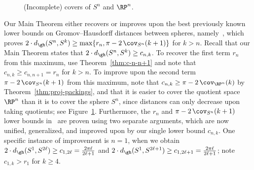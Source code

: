 \documentclass[11pt, reqno, english]{amsart}
\begin{document}
\begin{figure}[htb]
\caption{(Incomplete) covers of $S^n$ and $\RP^n$.}
\label{fig:cover}
\end{figure}

\begin{remark}
\label{rem:improvement}
Our Main Theorem either recovers or improves upon the best previously known lower bounds on Gromov--Hausdorff distances between spheres, namely~\cite{lim2021gromov}, which proves $2\cdot d_{\gh}(S^n, S^k) \ge \max\{r_n,\pi - 2\,\cov_{S^n}(k+1)\}$ for $k>n$.
Recall that our Main Theorem states that $2\cdot d_{\gh}(S^n, S^k) \geq c_{n,k}$.
To recover the first term $r_n$ from this maximum, use Theorem~\ref{thm:c-n-n+1} and note that $c_{n,k}\ge c_{n,n+1}=r_n$ for $k>n$.
To improve upon the second term $\pi - 2\,\cov_{S^n}(k+1)$ from this maximum, note that $c_{n,k} \ge \pi-2\,\cov_{\RP^n}(k)$ by Theorem~\ref{thm:proj-packings}, and that it is easier to cover the quotient space $\RP^n$ than it is to cover the sphere $S^n$, since distances can only decrease upon taking quotients; see Figure~\ref{fig:cover}.
Furthermore, the $r_n$ and $\pi - 2\,\cov_{S^n}(k+1)$ lower bounds in~\cite{lim2021gromov} are proven using two separate arguments, which are now unified, generalized, and improved upon by our single lower bound $c_{n,k}$.
One specific instance of improvement is $n=1$, when we obtain $2\cdot d_{\gh}(S^1, S^{2\ell}) \ge c_{1,2\ell} = \tfrac{2\pi \ell}{2\ell+1}$ and $2\cdot d_{\gh}(S^1, S^{2\ell+1}) \ge c_{1,2\ell+1} = \tfrac{2\pi \ell}{2\ell+1}$; note $c_{1,k} > r_1$ for $k\ge 4$.
\end{remark}
\end{document}
